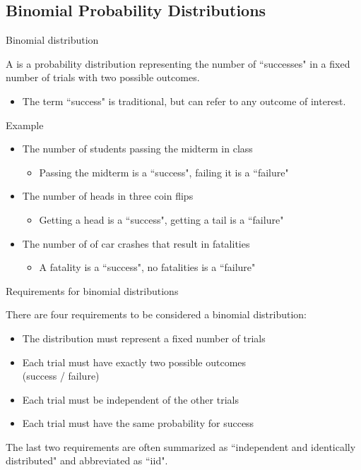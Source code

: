 \documentclass[xcolor=table]{beamer}
\begin{document}
\subsection{Binomial Probability Distributions}

\begin{frame}{Binomial distribution}
\begin{block}{}
{\large A  is a probability distribution representing the number of ``successes" in a fixed number of trials with two possible outcomes. }
\begin{itemize}
\pause\item The term ``success" is traditional, but can refer to any outcome of interest.
\end{itemize}
\end{block}
\pause
\begin{exampleblock}{Example}
\begin{itemize}
\item The number of students passing the midterm in class
\begin{itemize}
\item Passing the midterm is a ``success", failing it is a ``failure"
\end{itemize}
\pause\item The number of heads in three coin flips
\begin{itemize}
\item Getting a head is a ``success", getting a tail is a ``failure"
\end{itemize}
\pause\item The number of of car crashes that result in fatalities
\begin{itemize}
\item A fatality is a ``success", no fatalities is a ``failure"
\end{itemize}

\end{itemize}
\end{exampleblock}
\end{frame}

\begin{frame}{Requirements for binomial distributions}
\begin{block}{}
There are four requirements to be considered a binomial distribution:
\begin{itemize}
\pause\item The distribution must represent a fixed number of trials
\pause\item Each trial must have exactly two possible outcomes\\(success / failure)
\pause\item Each trial must be independent of the other trials
\pause\item Each trial must have the same probability for success
\end{itemize}
\pause The last two requirements are often summarized as ``independent and identically distributed" and abbreviated as ``iid".
\end{block}
\end{frame}
\end{document}
